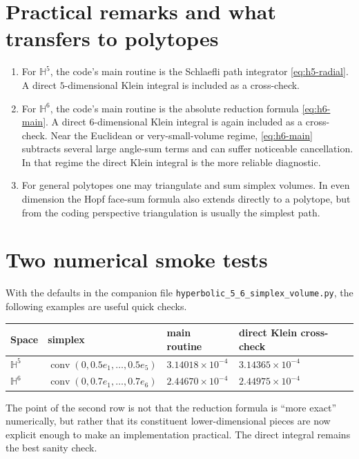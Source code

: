 \documentclass[11pt]{article}
\newcommand{\Hh}{\mathbb{H}}
\newcommand{\conv}{\operatorname{conv}}
\begin{document}
\section{Practical remarks and what transfers to polytopes}

\begin{enumerate}[leftmargin=2.2em]
\item For $\Hh^5$, the code's main routine is the Schlaefli path integrator
\eqref{eq:h5-radial}.  A direct $5$-dimensional Klein integral is included as a cross-check.

\item For $\Hh^6$, the code's main routine is the absolute reduction formula
\eqref{eq:h6-main}.  A direct $6$-dimensional Klein integral is again included as a cross-check.
Near the Euclidean or very-small-volume regime, \eqref{eq:h6-main} subtracts several large angle-sum
terms and can suffer noticeable cancellation.  In that regime the direct Klein integral is the more
reliable diagnostic.

\item For general polytopes one may triangulate and sum simplex volumes.  In even dimension the Hopf
face-sum formula also extends directly to a polytope, but from the coding perspective triangulation
is usually the simplest path.
\end{enumerate}

\section{Two numerical smoke tests}

With the defaults in the companion file \texttt{hyperbolic\_5\_6\_simplex\_volume.py}, the following
examples are useful quick checks.

\begin{center}
\begin{tabular}{@{}llll@{}}
\toprule
Space & simplex & main routine & direct Klein cross-check \\
\midrule
$\Hh^5$ & $\conv(0,0.5e_1,\dots,0.5e_5)$ & $3.14018\times 10^{-4}$ & $3.14365\times 10^{-4}$ \\
$\Hh^6$ & $\conv(0,0.7e_1,\dots,0.7e_6)$ & $2.44670\times 10^{-4}$ & $2.44975\times 10^{-4}$ \\
\bottomrule
\end{tabular}
\end{center}

The point of the second row is not that the reduction formula is ``more exact'' numerically, but
rather that its constituent lower-dimensional pieces are now explicit enough to make an implementation
practical.  The direct integral remains the best sanity check.
\end{document}
